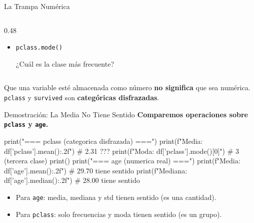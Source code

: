 \documentclass[aspectratio=169, 11pt]{beamer}
\begin{document}
\begin{frame}[shrink=5]{La Trampa Numérica}
\begin{columns}[T]
\begin{column}{0.48\textwidth}
{\begin{itemize}
          ¿Qué proporción sobrevivió?
        \item \texttt{pclass.mode()}

          ¿Cuál es la clase más frecuente?
      \end{itemize}
      }
    \end{column}
  \end{columns}

  \vspace{8pt}
  {\footnotesize\color{arcaDark}
    \faLightbulb\hspace{4pt}
    Que una variable esté almacenada como número \textbf{no significa}
    que sea numérica. \texttt{pclass} y \texttt{survived} son
    \textbf{categóricas disfrazadas}.}
\end{frame}

\begin{frame}[fragile,shrink=28]{Demostración: La Media No Tiene Sentido}
  \vspace{-6pt}
  {\footnotesize\color{arcaDark}\bfseries
    Comparemos operaciones sobre \texttt{pclass} y \texttt{age}.}

  \vspace{4pt}
  \begin{pyblock}
print("=== pclass (categorica disfrazada) ===")
print(f"Media:   {df['pclass'].mean():.2f}")   # 2.31 ???
print(f"Moda:    {df['pclass'].mode()[0]}")     # 3 (tercera clase)
print()
print("=== age (numerica real) ===")
print(f"Media:   {df['age'].mean():.2f}")       # 29.70 tiene sentido
print(f"Mediana: {df['age'].median():.2f}")     # 28.00 tiene sentido
  \end{pyblock}

  \vspace{4pt}
  {\scriptsize\color{textMuted}
  \begin{itemize}\setlength{\itemsep}{3pt}
    \item[{\color{arcaRed}\scriptsize\faArrowRight}]
      Para \texttt{age}: media, mediana y std tienen sentido (es una cantidad).
    \item[{\color{arcaRed}\scriptsize\faArrowRight}]
      Para \texttt{pclass}: solo frecuencias y moda tienen sentido (es un grupo).
  \end{itemize}
  }
\end{frame}
\end{document}
